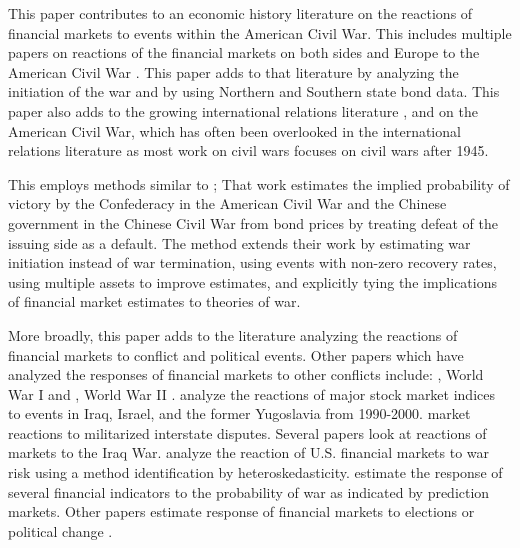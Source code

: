 This paper contributes to an economic history literature on the reactions of financial markets to events within the American Civil War.
This includes multiple papers on reactions of the financial markets on both sides and Europe to the American Civil War \textcites{Schwab1901}{Mitchell1903}{WillardGuinnaneEtAl1996}{McCandless1996}{SmithSmith1997}{BrownBurdekin2000}{Weidenmier2002}.
This paper adds to that literature by analyzing the initiation of the war and by using Northern and Southern state bond data.
This paper also adds to the growing international relations literature \textcite{Poast2012}, and \textcite{Reiter2009} on the American Civil War, which has often been overlooked in the international relations literature as most work on civil wars focuses on civil wars after 1945.

This employs methods similar to \textcite{HaberMitchenerOosterlinckEtAl2015};
That work estimates the implied probability of victory by the Confederacy in the American Civil War and the Chinese government in the Chinese Civil War from bond prices by treating defeat of the issuing side as a default.
The method extends their work by estimating war initiation instead of war termination, using events with non-zero recovery rates, using multiple assets to improve estimates, and explicitly tying the implications of financial market estimates to theories of war.

More broadly, this paper adds to the literature analyzing the reactions of financial markets to conflict and political events.
Other papers which have analyzed the responses of financial markets to other conflicts include:  \textcite{Bueno1990}, World War I \textcite{Hall2004} and \textcite{Ferguson2006}, World War II \textcites{WaldenstromFrey2008}{WaldenstromFrey2008}.
\textcite{SchneiderTroeger2006} analyze the reactions of major stock market indices to events in Iraq, Israel, and the former Yugoslavia from 1990-2000.
\textcite{GuidolinLaFerrara2010} market reactions to militarized interstate disputes.
Several papers look at reactions of markets to the Iraq War.
\textcite{RigobonSack2005} analyze the reaction of U.S. financial markets to war risk using a method identification by heteroskedasticity.
\textcites{LeighWolfersEtAl2003}{WolfersZitzewitz2009} estimate the response of several financial indicators to the probability of war as indicated by prediction markets.
Other papers estimate response of financial markets to elections or political change \parencites{Jayachandr2006}{Herron2000}.



